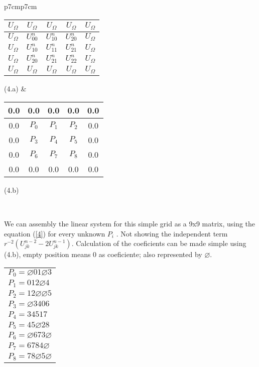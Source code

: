 \documentclass[legalpaper, 12pt]{article}
\begin{document}
\begin{tabular}{p{7cm}p{7cm}}
{ \begin{tabular}{| c | c | c | c | c |}
	\hline
	$U_{\Omega}$ & $U_{\Omega}$ & $U_{\Omega}$ & $U_{\Omega}$ & $U_{\Omega}$ \\ \hline
	$U_{\Omega}$ & { \color{red} $U_{00}^n$}& { \color{red} $U_{10}^n$ } & { \color{red} $U_{20}^n$ } & $U_{\Omega}$ \\ \hline
	$U_{\Omega}$ & { \color{red} $U_{10}^n$ } & { \color{red} $U_{11}^n$ } & { \color{red} $U_{21}^n$ } & $U_{\Omega}$\\ \hline
	$U_{\Omega}$ & { \color{red} $U_{20}^n$ } & { \color{red} $U_{21}^n$ } & { \color{red} $U_{22}^n$ } & $U_{\Omega}$\\ \hline
	$U_{\Omega}$ & $U_{\Omega}$ & $U_{\Omega}$ & $U_{\Omega}$ & $U_{\Omega}$ \\ \hline
\end{tabular} }
(4.a)
&
{ \begin{tabular}{| c | c | c | c | c |}
	\hline
	0.0 & 0.0 & 0.0 & 0.0 & 0.0 \\ \hline
	0.0 & { \color{red} $P_{0}$ } & { \color{red} $P_{1}$ } & { \color{red} $P_{2}$ } & 0.0 \\ \hline
	0.0 & { \color{red} $P_{3}$ } & { \color{red} $P_{4}$ } & { \color{red} $P_{5}$ } & 0.0 \\ \hline
	0.0 & { \color{red} $P_{6}$ } & { \color{red} $P_{7}$ } & { \color{red} $P_{8}$ } & 0.0 \\ \hline
	0.0 & 0.0 & 0.0 & 0.0 & 0.0 \\ \hline
\end{tabular} }
(4.b)
\end{tabular}


\
\newline

We can assembly the linear system for this simple grid as a 9x9 matrix, using the equation (\ref{4}) for every unknown $ P_i $ . Not showing the independent term $  r^{-2} \left( U_{jk}^{n-2} -2 U_{jk}^{n-1} \right) $. Calculation of the coeficients can be made simple  using (4.b), empty position means 0 as coeficiente; also represented by $ \varnothing $.

\begin{center}
\begin{tabular}{ l }
$ P_0 = \varnothing  0  1  \varnothing 3  $ \\
$ P_1 = 0 1 2 \varnothing 4 $ \\
$ P_2 = 1 2 \varnothing \varnothing 5 $ \\
$ P_3 = \varnothing 3 4 0 6 $\\
$ P_4 = 3 4 5 1 7 $\\
$ P_5 = 4 5 \varnothing 2 8 $\\
$ P_6 = \varnothing 6 7 3 \varnothing $\\
$ P_7 = 6 7 8 4 \varnothing $\\
$ P_8 = 7 8 \varnothing 5 \varnothing $\\
\end{tabular}
\end{center}
\end{document}
